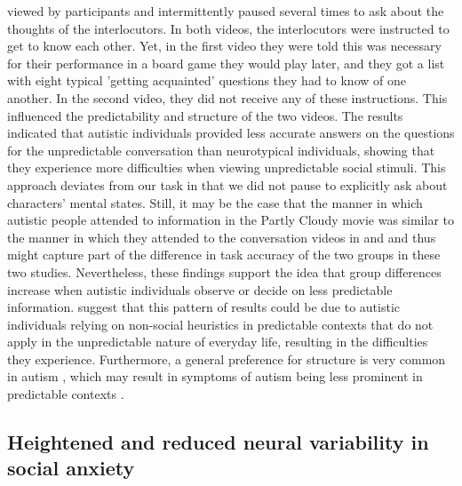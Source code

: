 viewed by participants and intermittently paused several times to ask about the thoughts of the interlocutors. In both videos, the interlocutors were instructed to get to know each other. Yet, in the first video they were told this was necessary for their performance in a board game they would play later, and they got a list with eight typical 'getting acquainted' questions they had to know of one another. In the second video, they did not receive any of these instructions. This influenced the predictability and structure of the two videos. The results indicated that autistic individuals provided less accurate answers on the questions for the unpredictable conversation than neurotypical individuals, showing that they experience more difficulties when viewing unpredictable social stimuli. This approach deviates from our task in that we did not pause to explicitly ask about characters' mental states. Still, it may be the case that the manner in which autistic people attended to information in the Partly Cloudy movie was similar to the manner in which they attended to the conversation videos in \cite{roeyers2001} and \cite{ponnet2008} and thus might capture part of the difference in task accuracy of the two groups in these two studies. Nevertheless, these findings support the idea that group differences increase when autistic individuals observe or decide on less predictable information. \cite{frith1994} suggest that this pattern of results could be due to autistic individuals relying on non-social heuristics in predictable contexts that do not apply in the unpredictable nature of everyday life, resulting in the difficulties they experience. Furthermore, a general preference for structure is very common in autism \citep{apa2013}, which may result in symptoms of autism being less prominent in predictable contexts \citep{howlin2004,mesibov1992}. 

\subsection*{Heightened and reduced neural variability in social anxiety}


